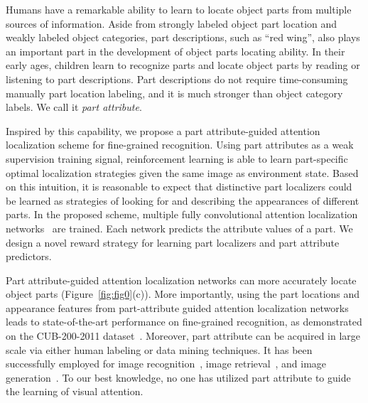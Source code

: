 \documentclass{article}
\begin{document}
Humans have a remarkable ability to learn to locate object parts from multiple sources of information. Aside from strongly labeled object part location and weakly labeled object categories, part descriptions,  such as ``red wing'', also plays an important part in the development of object parts locating ability. In their early ages, children learn to recognize parts and locate object parts by reading or listening to part descriptions. Part descriptions do not require time-consuming manually part location labeling, and it is much stronger than object category labels. We call it {\em part attribute}.

Inspired by this capability, we propose a part attribute-guided attention localization scheme for fine-grained recognition.
Using part attributes as a weak supervision training signal, reinforcement learning is able to learn part-specific optimal localization strategies given the same image as environment state.
Based on this intuition, it is reasonable to expect that distinctive part localizers could be learned as strategies of  looking for and describing the appearances of different parts.
In the proposed scheme, multiple fully convolutional attention localization networks~\cite{nips1} are trained. Each network predicts the attribute values of a part. We design a novel reward strategy for learning part localizers and part attribute predictors.

Part attribute-guided attention localization networks can more accurately locate object parts (Figure~\ref{fig:fig0}(c)). More importantly, using the part locations and appearance features from part-attribute guided attention localization networks leads to state-of-the-art performance on fine-grained recognition, as demonstrated on the CUB-200-2011 dataset~\cite{bd6}.
Moreover, part attribute can be acquired in large scale via either human labeling or data mining techniques. It has been successfully employed for image recognition~\cite{parikh2011relative,akata2013label,hwang2014unified}, image retrieval~\cite{huang2015cross}, and image generation~\cite{yan2015attribute2image}.  To our best knowledge, no one has utilized part attribute to guide the learning of visual attention.

\end{document}
